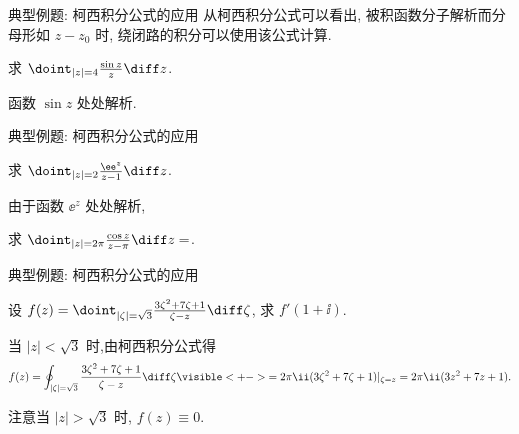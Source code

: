 \begin{frame}{典型例题: 柯西积分公式的应用}
	\onslide<+->
	从柯西积分公式可以看出, 被积函数分子解析而分母形如 $z-z_0$ 时, 绕闭路的积分可以使用该公式计算.

	\onslide<+->
	\begin{example}
		求 $\doint_{|z|=4}\frac{\sin z}z\diff z$.
	\end{example}

	\onslide<+->
	\begin{solution}
		函数 $\sin z$ 处处解析.
		\vspace{-.5\baselineskip}
	\end{solution}
\end{frame}


\begin{frame}{典型例题: 柯西积分公式的应用}
	\onslide<+->
	\begin{example}
		求 $\doint_{|z|=2}\frac{\ee^z}{z-1}\diff z$.
	\end{example}

	\onslide<+->
	\begin{solution}
		由于函数 $\ee^z$ 处处解析,
		\vspace{-.5\baselineskip}
	\end{solution}

	\onslide<+->
	\begin{exercise}
		求 $\doint_{|z|=2\pi}\frac{\cos z}{z-\pi}\diff z=$\fillblankframe{$-2\pi\ii$}.
	\end{exercise}
\end{frame}


\begin{frame}{典型例题: 柯西积分公式的应用}
	\onslide<+->
	\begin{example}
		设 $f(z)=\doint_{|\zeta|=\sqrt3}\frac{3\zeta^2+7\zeta+1}{\zeta-z}\diff \zeta$, 求 $f'(1+\ii)$.
	\end{example}

	\onslide<+->
	\begin{solution}
		当 $|z|<\sqrt3$ 时,由柯西积分公式得
	\[
			f(z)=\oint_{|\zeta|=\sqrt3}\frac{3\zeta^2+7\zeta+1}{\zeta-z}\diff \zeta
			\visible<+->{=2\pi\ii(3\zeta^2+7\zeta+1)|_{\zeta=z}=2\pi\ii(3z^2+7z+1).}
	\]
		\onslide<+->{
			$f'(1+\ii)=2\pi\ii(13+6\ii)=-12\pi+26\pi\ii$.
		}
	\end{solution}
	\onslide<+->
	注意当 $|z|>\sqrt3$ 时, $f(z)\equiv0$.
\end{frame}


